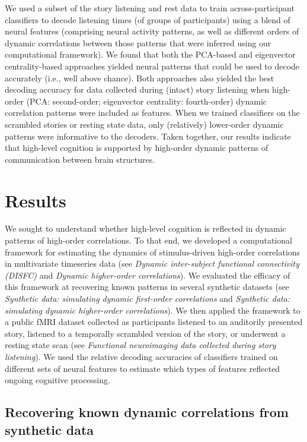 \documentclass[english]{article}
\begin{document}
We used a subset of the story listening and rest data to train
across-participant classifiers to decode listening times (of groups of
participants) using a blend of neural features (comprising neural
activity patterns, as well as different orders of dynamic correlations
between those patterns that were inferred using our computational
framework).  We found that both the PCA-based and eigenvector
centrality-based approaches yielded neural patterns that could be used
to decode accurately (i.e., well above chance).  Both approaches also
yielded the best decoding accuracy for data collected during (intact)
story listening when high-order (PCA: second-order; eigenvector
centrality: fourth-order) dynamic correlation patterns were included
as features.  When we trained classifiers on the scrambled stories or
resting state data, only (relatively) lower-order dynamic patterns
were informative to the decoders.  Taken together, our results
indicate that high-level cognition is supported by high-order dynamic
patterns of communication between brain structures.




\section*{Results}
We sought to understand whether high-level cognition is reflected in
dynamic patterns of high-order correlations.  To that end, we
developed a computational framework for estimating the dynamics of
stimulus-driven high-order correlations in multivariate timeseries
data (see \textit{Dynamic inter-subject functional connectivity
  (DISFC)} and \textit{Dynamic higher-order correlations}).  We
evaluated the efficacy of this framework at recovering known patterns
in several synthetic datasets (see \textit{Synthetic data: simulating
  dynamic first-order correlations} and \textit{Synthetic data:
  simulating dynamic higher-order correlations}).  We then
applied the framework to a public fMRI dataset collected as
participants listened to an auditorily presented story, listened to a
temporally scrambled version of the story, or underwent a resting
state scan (see \textit{Functional neuroimaging data collected during
  story listening}).  We used the relative decoding accuracies of
classifiers trained on different sets of neural features to estimate
which types of features reflected ongoing cognitive processing.

\subsection*{Recovering known dynamic correlations from synthetic
  data}
\end{document}
